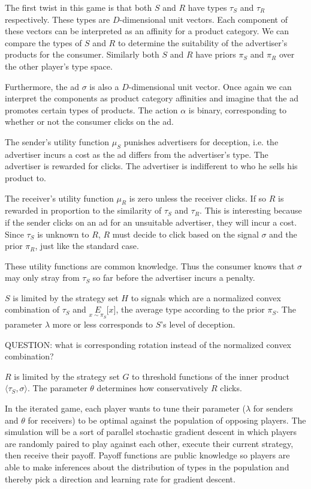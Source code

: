 \documentclass{article}
\begin{document}
\noindent The first twist in this game is that both $S$ and $R$ have types $\tau_S$ and $\tau_R$ respectively. These types are $D$-dimensional unit vectors. Each component of these vectors can be interpreted as an affinity for a product category. We can compare the types of $S$ and $R$ to determine the suitability of the advertiser's products for the consumer. Similarly both $S$ and $R$ have priors $\pi_S$ and $\pi_R$ over the other player's type space.

Furthermore, the ad $\sigma$ is also a $D$-dimensional unit vector. Once again we can interpret the components as product category affinities and imagine that the ad promotes certain types of products. The action $\alpha$ is binary, corresponding to whether or not the consumer clicks on the ad.

The sender's utility function $\mu_S$ punishes advertisers for deception, i.e. the advertiser incurs a cost as the ad differs from the advertiser's type. The advertiser is rewarded for clicks. The advertiser is indifferent to who he sells his product to.

The receiver's utility function $\mu_R$ is zero unless the receiver clicks. If so $R$ is rewarded in proportion to the similarity of $\tau_S$ and $\tau_R$. This is interesting because if the sender clicks on an ad for an unsuitable advertiser, they will incur a cost. Since $\tau_S$ is unknown to $R$, $R$ must decide to click based on the signal $\sigma$ and the prior $\pi_R$, just like the standard case.

These utility functions are common knowledge. Thus the consumer knows that $\sigma$ may only stray from $\tau_S$ so far before the advertiser incurs a penalty.

$S$ is limited by the strategy set $H$ to signals which are a normalized convex combination of $\tau_S$ and $\underset{x\sim\pi_S}{E}\lbrack x \rbrack$, the average type according to the prior $\pi_S$. The parameter $\lambda$ more or less corresponds to $S$'s level of deception.

QUESTION: what is corresponding rotation instead of the normalized convex combination?

$R$ is limited by the strategy set $G$ to threshold functions of the inner product $\langle \tau_S, \sigma \rangle$. The parameter $\theta$ determines how conservatively $R$ clicks.

In the iterated game, each player wants to tune their parameter ($\lambda$ for senders and $\theta$ for receivers) to be optimal against the population of opposing players. The simulation will be a sort of parallel stochastic gradient descent in which players are randomly paired to play against each other, execute their current strategy, then receive their payoff. Payoff functions are public knowledge so players are able to make inferences about the distribution of types in the population and thereby pick a direction and learning rate for gradient descent.
\end{document}
